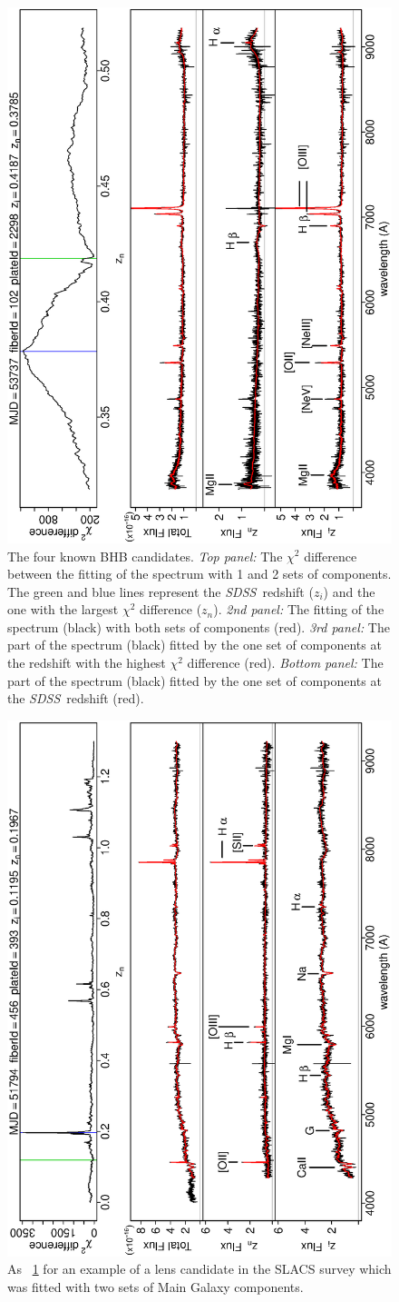 \documentclass[12pt,preprint]{aastex}
\newcommand{\project}[1]{\textsl{#1}}
\newcommand{\sdss}{\project{SDSS}}
\newcommand{\SDSS}{\sdss}
\begin{document}
\begin{figure}
\includegraphics[angle=-90,width=0.49\columnwidth]{paper_plots/paper_bhb102}
\caption{The four known BHB candidates. \textsl{Top panel:} The
  $\chi^2$ difference between the fitting of the spectrum with 1 and 2
  sets of components. The green and blue lines represent the \SDSS\  
  redshift ($z_i$) and the one with the largest $\chi^2$
  difference ($z_n$). \textsl{2nd panel:} The fitting of the spectrum (black)
  with both sets of components (red). \textsl{3rd panel:} The part of
  the spectrum (black) fitted by the one set of components at the
  redshift with the highest $\chi^2$ difference (red). \textsl{Bottom
    panel:} The part of the spectrum (black) fitted by the one set of
  components at the \SDSS\ redshift (red).}
\label{fig:6a}
\end{figure}

\clearpage
\begin{figure}
\includegraphics[angle=-90,width=0.49\columnwidth]{paper_plots/paper_13gg}
\caption{As \figurename~\ref{fig:6a} for an example of a lens candidate in the SLACS survey
  which was fitted with two sets of Main Galaxy components.}
\label{fig:6}
\end{figure}
\end{document}
